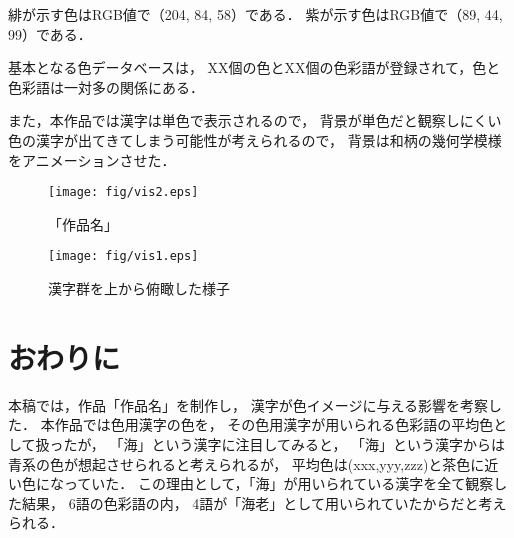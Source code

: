 \documentclass[a4j,twocolumn]{ujarticle} %
\newcommand{\workname}{「作品名」}
\newcommand{\colorname}{色彩語}
\newcommand{\colorkanji}{色用漢字}
\begin{document}
緋が示す色はRGB値で（204, 84, 58）である．
紫が示す色はRGB値で（89, 44, 99）である．

基本となる色データベースは，
XX個の色とXX個の\colorname{}が登録されて，色と\colorname{}は一対多の関係にある．

また，本作品では漢字は単色で表示されるので，
背景が単色だと観察しにくい色の漢字が出てきてしまう可能性が考えられるので，
背景は和柄の幾何学模様をアニメーションさせた．

\begin{figure}[htbp]
  \texttt{[image: fig/vis2.eps]}
  \caption{\workname{}}
  \label{works1}
\end{figure}

\begin{figure}[htbp]
  \texttt{[image: fig/vis1.eps]}
  \caption{漢字群を上から俯瞰した様子}
  \label{works1}
\end{figure}

\section{おわりに}

本稿では，作品\workname{}を制作し，
漢字が色イメージに与える影響を考察した．
本作品では\colorkanji{}の色を，
その\colorkanji{}が用いられる\colorname{}の平均色として扱ったが，
「海」という漢字に注目してみると，
「海」という漢字からは青系の色が想起させられると考えられるが，
平均色は(xxx,yyy,zzz)と茶色に近い色になっていた．
この理由として，「海」が用いられている漢字を全て観察した結果，
6語の\colorname{}の内，
4語が「海老」として用いられていたからだと考えられる．




\end{document}
